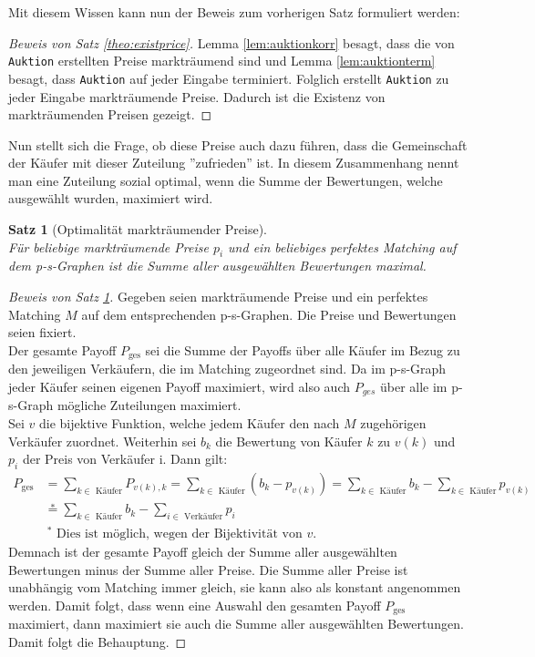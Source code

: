 \documentclass[a4paper]{scrreprt}
\theoremstyle{plain} %
\newtheorem{theorem}{Satz}[chapter]
\theoremstyle{definition} %
\begin{document}
\noindent
Mit diesem Wissen kann nun der Beweis zum vorherigen Satz formuliert werden:

\begin{proof}[Beweis von Satz \ref{theo:existprice}]
Lemma \ref{lem:auktionkorr} besagt, dass die von \texttt{Auktion} erstellten Preise markträumend sind und Lemma 
\ref{lem:auktionterm} besagt, dass \texttt{Auktion} auf jeder Eingabe terminiert. Folglich erstellt
\texttt{Auktion} zu jeder Eingabe markträumende Preise. Dadurch ist die Existenz von markträumenden Preisen 
 gezeigt.
\end{proof}


\noindent
Nun stellt sich die Frage, ob diese Preise auch dazu führen, dass die Gemeinschaft der Käufer mit dieser Zuteilung 
 ''zufrieden'' ist. In diesem Zusammenhang nennt man eine Zuteilung sozial optimal, wenn die Summe
der Bewertungen, welche ausgewählt wurden, maximiert wird.


\begin{theorem}[Optimalität markträumender Preise] ~\\
Für beliebige markträumende Preise $p_i$ und ein beliebiges perfektes Matching auf
dem p-s-Graphen ist die Summe aller ausgewählten Bewertungen maximal. \label{optmarkt}
\end{theorem}


\begin{proof}[Beweis von Satz \ref{optmarkt}]
Gegeben seien markträumende Preise und ein perfektes Matching $M$ auf dem entsprechenden
p-s-Graphen. Die Preise und Bewertungen seien fixiert.
\\
Der gesamte Payoff $P_{\text{ges}}$ sei die Summe der Payoffs über alle Käufer im Bezug zu den jeweiligen Verkäufern, 
die im Matching zugeordnet sind. Da im p-s-Graph jeder Käufer seinen
eigenen Payoff maximiert, wird also auch $P_{ges}$ über alle im p-s-Graph mögliche Zuteilungen maximiert.
\\
Sei $v$ die bijektive Funktion, welche jedem Käufer
den nach $M$ zugehörigen Verkäufer zuordnet.
Weiterhin sei $b_k$ die Bewertung von Käufer $k$ zu $v(k)$ und $p_i$ der Preis von Verkäufer i. 
Dann gilt: 
\begin{align*}
P_{\text{ges}} &= \sum_{k \in\text{ Käufer}} P_{v(k),k} = \sum_{k\in \text{ Käufer}} (b_k -p_{v(k)})
= \sum_{k \in \text{ Käufer}} b_k - \sum_{k \in \text{ Käufer}} p_{v(k)}\\
&\overset{*}{=} \sum_{k \in \text{ Käufer}} b_k - \sum_{i \in \text{ Verkäufer}} p_{i}
\\
&\ \text{$^*$ Dies ist möglich, wegen der Bijektivität von $v$.}
\end{align*}
Demnach ist der gesamte Payoff gleich der Summe aller ausgewählten Bewertungen minus der Summe aller Preise.
Die Summe aller Preise ist unabhängig vom Matching immer gleich, sie kann also als konstant angenommen werden.
Damit folgt, dass wenn eine Auswahl den gesamten Payoff $P_{\text{ges}}$ maximiert, dann maximiert sie auch die
Summe aller ausgewählten Bewertungen. 
\\
Damit folgt die Behauptung.
\end{proof}
\end{document}
